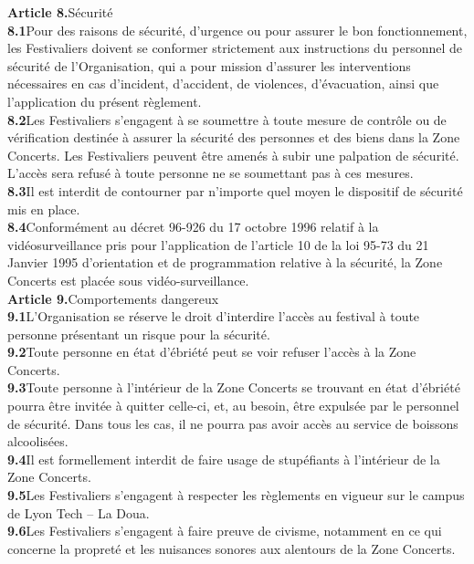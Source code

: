 \documentclass[hidelinks, paper=a4, fontsize=13pt]{report}
\begin{document}
\textbf{Article 8.}\hspace{3mm}Sécurité\\
\textbf{8.1}\hspace{3mm}Pour des raisons de sécurité, d’urgence ou pour assurer le bon fonctionnement, les Festivaliers doivent se conformer strictement aux instructions du personnel de sécurité de l’Organisation, qui a pour mission d’assurer les interventions nécessaires en cas d’incident, d’accident, de violences, d’évacuation, ainsi que l’application du présent règlement.\\
\textbf{8.2}\hspace{3mm}Les Festivaliers s’engagent à se soumettre à toute mesure de contrôle ou de vérification destinée à assurer la sécurité des personnes et des biens dans la Zone Concerts. Les Festivaliers peuvent être amenés à subir une palpation de sécurité. L’accès sera refusé à toute personne ne se soumettant pas à ces mesures.\\
\textbf{8.3}\hspace{3mm}Il est interdit de contourner par n’importe quel moyen le dispositif de sécurité mis en place.\\
\textbf{8.4}\hspace{3mm}Conformément au décret 96-926 du 17 octobre 1996 relatif à la vidéosurveillance pris pour l’application de l’article 10 de la loi 95-73 du 21 Janvier 1995 d’orientation et de programmation relative à la sécurité, la Zone Concerts est placée sous vidéo-surveillance.\\


\textbf{Article 9.}\hspace{3mm}Comportements dangereux\\
\textbf{9.1}\hspace{3mm}L’Organisation se réserve le droit d’interdire l’accès au festival à toute personne présentant un risque pour la sécurité.\\
\textbf{9.2}\hspace{3mm}Toute personne en état d’ébriété peut se voir refuser l’accès à la Zone Concerts. \\
\textbf{9.3}\hspace{3mm}Toute personne à l’intérieur de la Zone Concerts se trouvant en état d’ébriété pourra être invitée à quitter celle-ci, et, au besoin, être expulsée par le personnel de sécurité. Dans tous les cas, il ne pourra pas avoir accès au service de boissons alcoolisées.\\
\textbf{9.4}\hspace{3mm}Il est formellement interdit de faire usage de stupéfiants à l’intérieur de la Zone Concerts.\\
\textbf{9.5}\hspace{3mm}Les Festivaliers s’engagent à respecter les règlements en vigueur sur le campus de Lyon Tech – La Doua.\\
\textbf{9.6}\hspace{3mm}Les Festivaliers s’engagent à faire preuve de civisme, notamment en ce qui concerne la propreté et les nuisances sonores aux alentours de la Zone Concerts.\\
\end{document}
